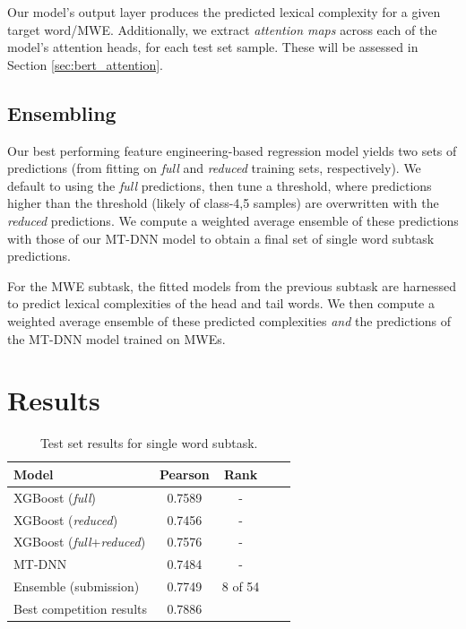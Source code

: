 \documentclass[11pt,a4paper]{article}
\begin{document}
Our model's output layer produces the predicted lexical complexity for a given target word/MWE. Additionally, we extract \textit{attention maps} across each of the model's attention heads, for each test set sample. These will be assessed in Section \ref{sec:bert_attention}.

\subsection{Ensembling}

Our best performing feature engineering-based regression model yields two sets of predictions (from fitting on \textit{full} and \textit{reduced} training sets, respectively). We default to using the \textit{full} predictions, then tune a threshold, where predictions higher than the threshold (likely of class-4,5 samples) are overwritten with the \textit{reduced} predictions. We compute a weighted average ensemble of these predictions with those of our MT-DNN model to obtain a final set of single word subtask predictions. 

For the MWE subtask, the fitted models from the previous subtask are harnessed to predict lexical complexities of the head and tail words. We then compute a weighted average ensemble of these predicted complexities \textit{and} the predictions of the MT-DNN model trained on MWEs.

\section{Results}

\begin{table}
  \centering
  \begin{tabular}{lcccc}
  \hline \textbf{Model} & \textbf{Pearson} & \textbf{Rank} & \\ \hline
  XGBoost (\textit{full}) &	0.7589 & - \\
  XGBoost (\textit{reduced}) &	0.7456 & - \\
  XGBoost (\textit{full}+\textit{reduced}) & 0.7576 & - \\
  MT-DNN & 0.7484 & - \\
  Ensemble (submission) & 0.7749 & 8 of 54 \\
  \hline
  Best competition results & 0.7886 & \\ 
  \hline
  \end{tabular}
  \caption{\label{tab:single-word-results} Test set results for single word subtask. }
\end{table}
\end{document}
